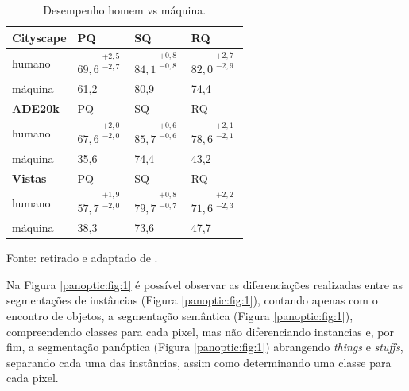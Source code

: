 \begin{table}[H]
    \centering
    \caption{Desempenho homem vs máquina.}
    \label{panoptic:table:1}
    \begin{tabular}{@{}l|lll@{}}
    \textbf{Cityscape} & PQ   & SQ   & RQ   \\ \hline
    humano              & $69,6^{\substack{+2,5\\-2,7}}$ & $84,1^{\substack{+0,8\\-0,8}}$ &  $82,0^{\substack{+2,7\\-2,9}}$ \\
    máquina            & 61,2 & 80,9 & 74,4 \vspace*{0,3cm}\\
    \textbf{ADE20k}    & PQ   & SQ   & RQ   \\ \hline
    humano              & $67,6^{\substack{+2,0\\-2,0}}$ & $85,7^{\substack{+0,6\\-0,6}}$ & $78,6^{\substack{+2,1\\-2,1}}$ \\
    máquina            & 35,6 & 74,4 & 43,2 \vspace*{0,3cm}\\
    \textbf{Vistas}    & PQ   & SQ   & RQ   \\ \hline
    humano              & $57,7^{\substack{+1,9\\-2,0}}$ & $79,7^{\substack{+0,8\\-0,7}}$ & $71,6^{\substack{+2,2\\-2,3}}$ \\
    máquina            & 38,3 & 73,6 & 47,7
    \end{tabular}

    \vspace*{1 cm}
    Fonte: retirado e adaptado de \cite{Kirillov2019a}.
\end{table}

Na Figura \ref{panoptic:fig:1} é possível observar as diferenciações realizadas entre as segmentações de instâncias (Figura \ref{panoptic:fig:1}), contando apenas com o encontro de objetos, a segmentação semântica (Figura \ref{panoptic:fig:1}), compreendendo classes para cada pixel, mas não diferenciando instancias e, por fim, a segmentação panóptica (Figura \ref{panoptic:fig:1}) abrangendo \textit{things} e \textit{stuffs}, separando cada uma das instâncias, assim como determinando uma classe para cada pixel.

